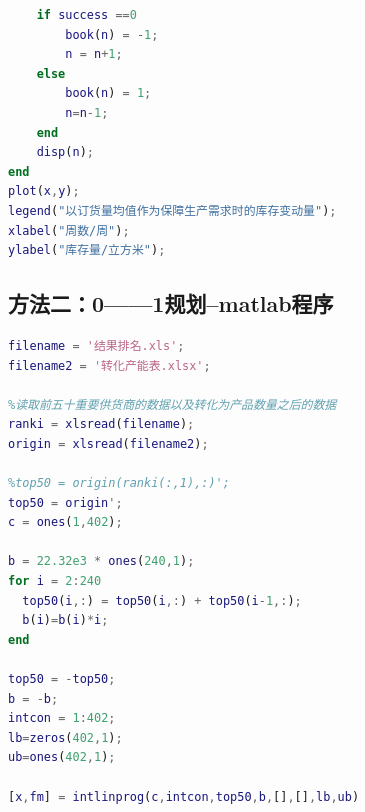 \documentclass[withoutpreface,bwprint]{cumcmthesis}
\begin{document}
\begin{appendices}
\begin{lstlisting}[language=matlab]
    %此处通过book标记测试状态 0-未测试 1 成功 -1失败
    if success ==0
        book(n) = -1;
        n = n+1;
    else
        book(n) = 1;
        n=n-1;
    end
    disp(n);
end
plot(x,y);
legend("以订货量均值作为保障生产需求时的库存变动量");
xlabel("周数/周");
ylabel("库存量/立方米");
\end{lstlisting}
\subsection{方法二：0——1规划--matlab程序}
\begin{lstlisting}[language=matlab]
filename = '结果排名.xls';
filename2 = '转化产能表.xlsx';

%读取前五十重要供货商的数据以及转化为产品数量之后的数据
ranki = xlsread(filename);
origin = xlsread(filename2);

%top50 = origin(ranki(:,1),:)';
top50 = origin';
c = ones(1,402);

b = 22.32e3 * ones(240,1);
for i = 2:240
  top50(i,:) = top50(i,:) + top50(i-1,:);
  b(i)=b(i)*i;
end

top50 = -top50;
b = -b;
intcon = 1:402;
lb=zeros(402,1);
ub=ones(402,1);

[x,fm] = intlinprog(c,intcon,top50,b,[],[],lb,ub)
    
    
    
\end{lstlisting}
   
\end{appendices}
\end{document}
